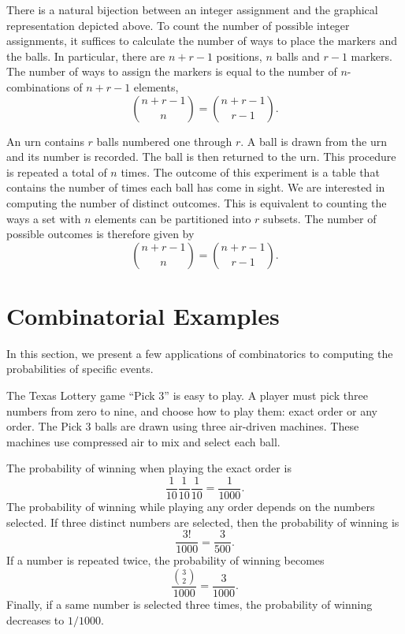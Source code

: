 There is a natural bijection between an integer assignment and the graphical representation depicted above.
To count the number of possible integer assignments, it suffices to calculate the number of ways to place the markers and the balls.
In particular, there are $n + r - 1$ positions, $n$ balls and $r - 1$ markers.
The number of ways to assign the markers is equal to the number of $n$-combinations of $n + r - 1$ elements,
\begin{equation*}
\binom{n + r - 1}{n} = \binom{n + r - 1}{r - 1} .
\end{equation*}

\begin{example}
An urn contains $r$ balls numbered one through $r$.
A ball is drawn from the urn and its number is recorded.
The ball is then returned to the urn.
This procedure is repeated a total of $n$ times.
The outcome of this experiment is a table that contains the number of times each ball has come in sight.
We are interested in computing the number of distinct outcomes.
This is equivalent to counting the ways a set with $n$ elements can be partitioned into $r$ subsets.
The number of possible outcomes is therefore given by
\begin{equation*}
\binom{n + r - 1}{n} = \binom{n + r - 1}{r - 1} .
\end{equation*}
\end{example}


\section{Combinatorial Examples}

In this section, we present a few applications of combinatorics to computing the probabilities of specific events.

\begin{example}
The Texas Lottery game ``Pick $3$'' is easy to play.
A player must pick three numbers from zero to nine, and choose how to play them: exact order or any order.
The Pick $3$ balls are drawn using three air-driven machines.
These machines use compressed air to mix and select each ball.

The probability of winning when playing the exact order is
\begin{equation*}
\frac{1}{10} \frac{1}{10} \frac{1}{10}
= \frac{1}{1000} .
\end{equation*}
The probability of winning while playing any order depends on the numbers selected.
If three distinct numbers are selected, then the probability of winning is
\begin{equation*}
\frac{3!}{1000} = \frac{3}{500} .
\end{equation*}
If a number is repeated twice, the probability of winning becomes
\begin{equation*}
\frac{\binom{3}{2}}{1000} = \frac{3}{1000} .
\end{equation*}
Finally, if a same number is selected three times, the probability of winning decreases to $1/1000$.
\end{example}

